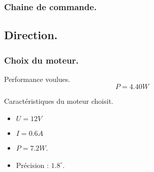 
\begin{frame}
    \frametitle{Chaine de commande.}
     {
        
    }
     {
        
    }
\end{frame}

\subsection{Direction.}
\begin{frame}
    \frametitle{Choix du moteur.}
    \begin{exampleblock}{Performance voulues.}
        \[ P = 4.40W \]
    \end{exampleblock}
     {
        \begin{block}{Caractéristiques du moteur choisit.}
            \begin{itemize}
                \item $U = 12V$
                \item $I = 0.6A$
                \item $P = 7.2W$.
                \item Précision : $1.8^\circ$.
            \end{itemize}
        \end{block}
    }
\end{frame}

